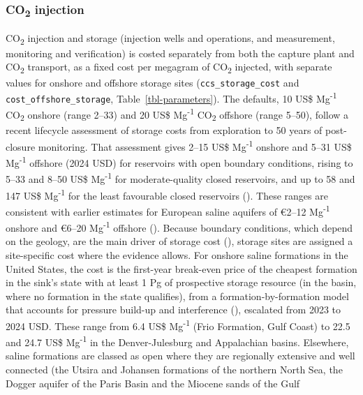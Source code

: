 \documentclass[
  letterpaper,
]{article}
\begin{document}
\subsubsection{\texorpdfstring{CO\textsubscript{2}
injection}{CO2 injection}}\label{co2-injection}

CO\textsubscript{2} injection and storage (injection wells and
operations, and measurement, monitoring and verification) is costed
separately from both the capture plant and CO\textsubscript{2}
transport, as a fixed cost per megagram of CO\textsubscript{2} injected,
with separate values for onshore and offshore storage sites
(\texttt{ccs\_storage\_cost} and \texttt{cost\_offshore\_storage},
Table~\ref{tbl-parameters}). The defaults, 10 US\$
Mg\textsuperscript{-1} CO\textsubscript{2} onshore (range 2--33) and 20
US\$ Mg\textsuperscript{-1} CO\textsubscript{2} offshore (range 5--50),
follow a recent lifecycle assessment of storage costs from exploration
to 50 years of post-closure monitoring. That assessment gives 2--15 US\$
Mg\textsuperscript{-1} onshore and 5--31 US\$ Mg\textsuperscript{-1}
offshore (2024 USD) for reservoirs with open boundary conditions, rising
to 5--33 and 8--50 US\$ Mg\textsuperscript{-1} for moderate-quality
closed reservoirs, and up to 58 and 147 US\$ Mg\textsuperscript{-1} for
the least favourable closed reservoirs
(). These ranges are consistent with
earlier estimates for European saline aquifers of €2--12
Mg\textsuperscript{-1} onshore and €6--20 Mg\textsuperscript{-1}
offshore (). Because boundary
conditions, which depend on the geology, are the main driver of storage
cost (), storage sites are assigned a
site-specific cost where the evidence allows. For onshore saline
formations in the United States, the cost is the first-year break-even
price of the cheapest formation in the sink's state with at least 1 Pg
of prospective storage resource (in the basin, where no formation in the
state qualifies), from a formation-by-formation model that accounts for
pressure build-up and interference
(), escalated from 2023 to 2024
USD. These range from 6.4 US\$ Mg\textsuperscript{-1} (Frio Formation,
Gulf Coast) to 22.5 and 24.7 US\$ Mg\textsuperscript{-1} in the
Denver-Julesburg and Appalachian basins. Elsewhere, saline formations
are classed as open where they are regionally extensive and well
connected (the Utsira and Johansen formations of the northern North Sea,
the Dogger aquifer of the Paris Basin and the Miocene sands of the Gulf
\end{document}
